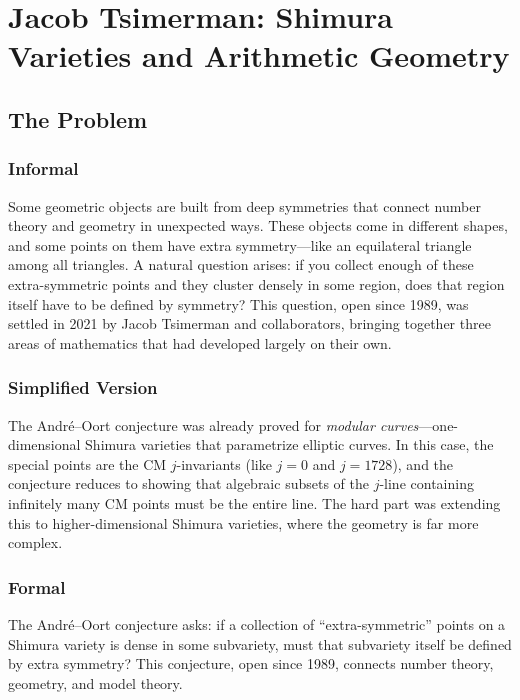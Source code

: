 \let\LocalMacro\relax

\chapter{Jacob Tsimerman: Shimura Varieties and Arithmetic Geometry}

\section{The Problem}

\subsection{Informal}
Some geometric objects are built from deep symmetries that connect number theory and geometry in unexpected ways. These objects come in different shapes, and some points on them have extra symmetry---like an equilateral triangle among all triangles. A natural question arises: if you collect enough of these extra-symmetric points and they cluster densely in some region, does that region itself have to be defined by symmetry? This question, open since 1989, was settled in 2021 by Jacob Tsimerman and collaborators, bringing together three areas of mathematics that had developed largely on their own.

\subsection{Simplified Version}
The André--Oort conjecture was already proved for \emph{modular curves}---one-dimensional Shimura varieties that parametrize elliptic curves. In this case, the special points are the CM $j$-invariants (like $j = 0$ and $j = 1728$), and the conjecture reduces to showing that algebraic subsets of the $j$-line containing infinitely many CM points must be the entire line. The hard part was extending this to higher-dimensional Shimura varieties, where the geometry is far more complex.

\subsection{Formal}

The André--Oort conjecture asks: if a collection of ``extra-symmetric'' points on a Shimura variety is dense in some subvariety, must that subvariety itself be defined by extra symmetry? This conjecture, open since 1989, connects number theory, geometry, and model theory.


